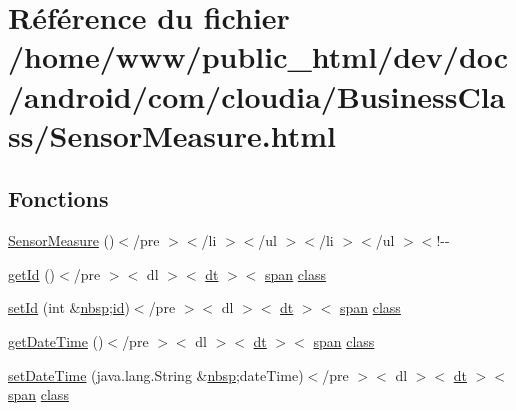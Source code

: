 \hypertarget{_sensor_measure_8html}{\section{Référence du fichier /home/www/public\-\_\-html/dev/doc/android/com/cloudia/\-Business\-Class/\-Sensor\-Measure.html}
\label{_sensor_measure_8html}
}
\subsection*{Fonctions}
\begin{DoxyCompactItemize}
\item 
\hyperlink{_sensor_measure_8html_a0932d9fa69dc3347fce14e8d3f893b8e}{Sensor\-Measure} ()$<$/pre $>$$<$/li $>$$<$/ul $>$$<$/li $>$$<$/ul $>$$<$!-\/-\/
\item 
\hyperlink{_sensor_measure_8html_ab3a0e513db813f22df2ca23e118d35a9}{get\-Id} ()$<$/pre $>$$<$ dl $>$$<$ \hyperlink{stylesheet_8css_a107565fb4039d33b041380d6e0ea1d80}{dt} $>$$<$ \hyperlink{stylesheet_8css_a8343996ebcf16220b04e54659aac31cc}{span} \hyperlink{_tools_8html_acf06f836132665ba8114f5a414c2403f}{class}
\item 
\hyperlink{_sensor_measure_8html_a6ba9489e16376022eacd82f234b7c21f}{set\-Id} (int \&\hyperlink{_tools_8html_aef915316f784c9063d942974538301a6}{nbsp};\hyperlink{index-9_8html_aa9b8ff1d03b739d1e752b9d9a5aa7c98}{id})$<$/pre $>$$<$ dl $>$$<$ \hyperlink{stylesheet_8css_a107565fb4039d33b041380d6e0ea1d80}{dt} $>$$<$ \hyperlink{stylesheet_8css_a8343996ebcf16220b04e54659aac31cc}{span} \hyperlink{_tools_8html_acf06f836132665ba8114f5a414c2403f}{class}
\item 
\hyperlink{_sensor_measure_8html_ac9eff0c37c84a362e8f91f4eafd79df9}{get\-Date\-Time} ()$<$/pre $>$$<$ dl $>$$<$ \hyperlink{stylesheet_8css_a107565fb4039d33b041380d6e0ea1d80}{dt} $>$$<$ \hyperlink{stylesheet_8css_a8343996ebcf16220b04e54659aac31cc}{span} \hyperlink{_tools_8html_acf06f836132665ba8114f5a414c2403f}{class}
\item 
\hyperlink{_sensor_measure_8html_a710ff54d5e1ed7d7e273c779bc2f5f2a}{set\-Date\-Time} (java.\-lang.\-String \&\hyperlink{_tools_8html_aef915316f784c9063d942974538301a6}{nbsp};date\-Time)$<$/pre $>$$<$ dl $>$$<$ \hyperlink{stylesheet_8css_a107565fb4039d33b041380d6e0ea1d80}{dt} $>$$<$ \hyperlink{stylesheet_8css_a8343996ebcf16220b04e54659aac31cc}{span} \hyperlink{_tools_8html_acf06f836132665ba8114f5a414c2403f}{class}
$$
\end{DoxyCompactItemize}

